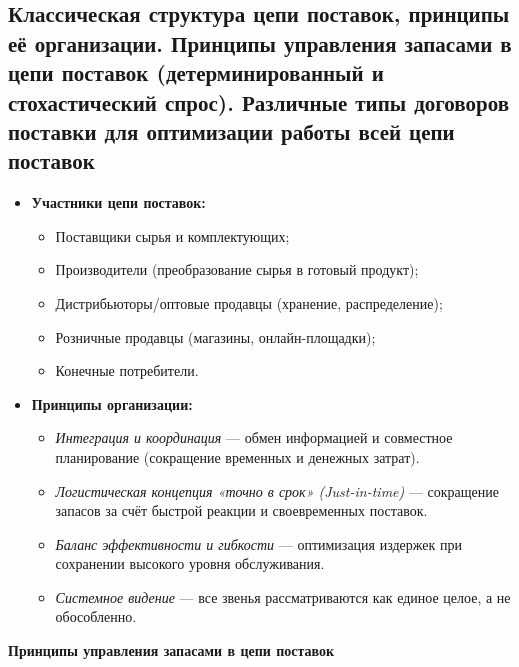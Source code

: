 \pagebreak

\subsection{Классическая структура цепи поставок, принципы её организации. Принципы управления запасами в цепи поставок (детерминированный и стохастический спрос). Различные типы договоров поставки для оптимизации работы всей цепи поставок}

\begin{itemize}
    \item \textbf{Участники цепи поставок:}
    \begin{itemize}
        \item Поставщики сырья и комплектующих;
        \item Производители (преобразование сырья в готовый продукт);
        \item Дистрибьюторы/оптовые продавцы (хранение, распределение);
        \item Розничные продавцы (магазины, онлайн-площадки);
        \item Конечные потребители.
    \end{itemize}
    \item \textbf{Принципы организации:}
    \begin{itemize}
        \item \textit{Интеграция и координация} — обмен информацией и совместное планирование (сокращение временных и денежных затрат).
        \item \textit{Логистическая концепция «точно в срок» (Just-in-time)} — сокращение запасов за счёт быстрой реакции и своевременных поставок.
        \item \textit{Баланс эффективности и гибкости} — оптимизация издержек при сохранении высокого уровня обслуживания.
        \item \textit{Системное видение} — все звенья рассматриваются как единое целое, а не обособленно.
    \end{itemize}
\end{itemize}

\textbf{Принципы управления запасами в цепи поставок}

